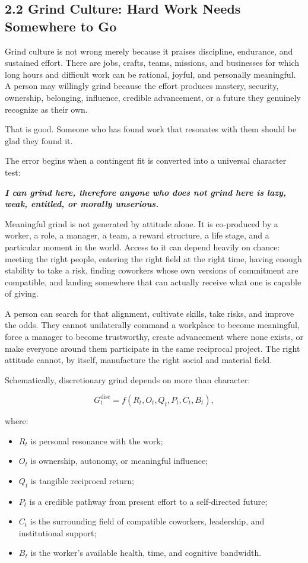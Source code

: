 \documentclass[11pt,oneside]{article}
\providecommand{\tightlist}{%
  \setlength{\itemsep}{0.22em}\setlength{\parskip}{0pt}}
\renewenvironment{quote}
  {\begin{tcolorbox}[
      enhanced,
      breakable,
      colback=ManifestLight,
      colframe=ManifestRule,
      boxrule=0pt,
      leftrule=3pt,
      arc=0pt,
      outer arc=0pt,
      left=10pt,right=10pt,top=8pt,bottom=8pt,
      before skip=0.8em,after skip=0.8em
    ]\itshape}
  {\end{tcolorbox}}
\begin{document}
\subsection{2.2 Grind Culture: Hard Work Needs Somewhere to
Go}\label{grind-culture-hard-work-needs-somewhere-to-go}

Grind culture is not wrong merely because it praises discipline,
endurance, and sustained effort. There are jobs, crafts, teams, missions,
and businesses for which long hours and difficult work can be rational,
joyful, and personally meaningful. A person may willingly grind because
the effort produces mastery, security, ownership, belonging, influence,
credible advancement, or a future they genuinely recognize as their
own.

That is good. Someone who has found work that resonates with them should
be glad they found it.

The error begins when a contingent fit is converted into a universal
character test:

\begin{quote}
\textbf{I can grind here, therefore anyone who does not grind here is
lazy, weak, entitled, or morally unserious.}
\end{quote}

Meaningful grind is not generated by attitude alone. It is co-produced
by a worker, a role, a manager, a team, a reward structure, a life stage,
and a particular moment in the world. Access to it can depend heavily on
chance: meeting the right people, entering the right field at the right
time, having enough stability to take a risk, finding coworkers whose
own versions of commitment are compatible, and landing somewhere that
can actually receive what one is capable of giving.

A person can search for that alignment, cultivate skills, take risks,
and improve the odds. They cannot unilaterally command a workplace to
become meaningful, force a manager to become trustworthy, create
advancement where none exists, or make everyone around them participate
in the same reciprocal project. The right attitude cannot, by itself,
manufacture the right social and material field.

Schematically, discretionary grind depends on more than character:

\[
G_t^{\mathrm{disc}}
=
f(R_t,O_t,Q_t,P_t,C_t,B_t),
\]

where:

\begin{itemize}
\tightlist
\item
  $R_t$ is personal resonance with the work;
\item
  $O_t$ is ownership, autonomy, or meaningful influence;
\item
  $Q_t$ is tangible reciprocal return;
\item
  $P_t$ is a credible pathway from present effort to a self-directed
  future;
\item
  $C_t$ is the surrounding field of compatible coworkers, leadership,
  and institutional support;
\item
  $B_t$ is the worker's available health, time, and cognitive bandwidth.
\end{itemize}
\end{document}
